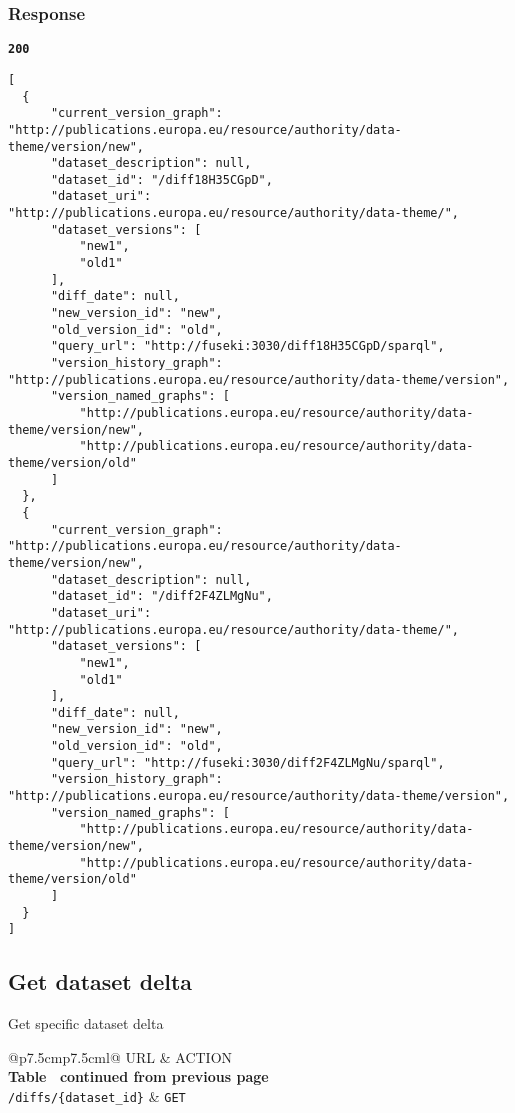 \subsubsection{Response}
\textbf{\texttt{200}}
\begin{lstlisting}
[
  {
      "current_version_graph": "http://publications.europa.eu/resource/authority/data-theme/version/new",
      "dataset_description": null,
      "dataset_id": "/diff18H35CGpD",
      "dataset_uri": "http://publications.europa.eu/resource/authority/data-theme/",
      "dataset_versions": [
          "new1",
          "old1"
      ],
      "diff_date": null,
      "new_version_id": "new",
      "old_version_id": "old",
      "query_url": "http://fuseki:3030/diff18H35CGpD/sparql",
      "version_history_graph": "http://publications.europa.eu/resource/authority/data-theme/version",
      "version_named_graphs": [
          "http://publications.europa.eu/resource/authority/data-theme/version/new",
          "http://publications.europa.eu/resource/authority/data-theme/version/old"
      ]
  },
  {
      "current_version_graph": "http://publications.europa.eu/resource/authority/data-theme/version/new",
      "dataset_description": null,
      "dataset_id": "/diff2F4ZLMgNu",
      "dataset_uri": "http://publications.europa.eu/resource/authority/data-theme/",
      "dataset_versions": [
          "new1",
          "old1"
      ],
      "diff_date": null,
      "new_version_id": "new",
      "old_version_id": "old",
      "query_url": "http://fuseki:3030/diff2F4ZLMgNu/sparql",
      "version_history_graph": "http://publications.europa.eu/resource/authority/data-theme/version",
      "version_named_graphs": [
          "http://publications.europa.eu/resource/authority/data-theme/version/new",
          "http://publications.europa.eu/resource/authority/data-theme/version/old"
      ]
  }
]
\end{lstlisting}

\subsection{Get dataset delta}
Get specific dataset delta

\begin{longtable}[c]{@{}p{7.5cm}p{7.5cm}l@{}}
  \toprule
  URL                             & ACTION                    \\* \midrule
  \endfirsthead
  \multicolumn{3}{c}%
  {{\bfseries Table \thetable\ continued from previous page}} \\
  \endhead
  \bottomrule
  \endfoot
  \endlastfoot
  \texttt{/diffs/\{dataset\_id\}} & \texttt{GET}              \\* \bottomrule
  \label{tab:rdf-differ-get-diffs}                            \\
\end{longtable}

